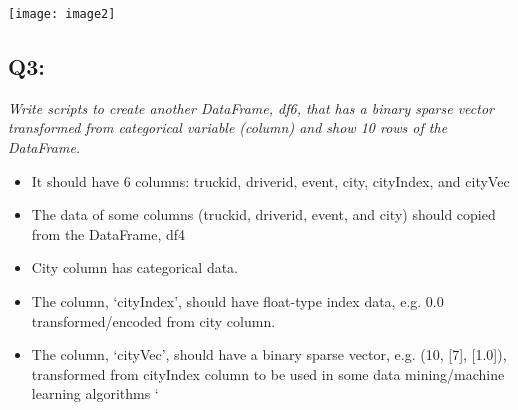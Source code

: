 \documentclass[]{article}
\begin{document}
\texttt{[image: image2]}

\subsection*{Q3: }
\emph{Write scripts to create another DataFrame, df6, 
	that has a binary sparse vector transformed from 
	categorical variable (column) and show 10 rows of the DataFrame.} \\
	\begin{itemize}[before=\itshape,font=\normalfont]
		\item It should have 6 columns: truckid, driverid, event, city, cityIndex, and cityVec
		\item The data of some columns (truckid, driverid, event, and city) should copied from the DataFrame, df4
		\item City column has categorical data.
		\item The column, ‘cityIndex’, should have float-type index data, e.g. 0.0 transformed/encoded from city column.
		\item The column, ‘cityVec’, should have a binary sparse vector, e.g. (10, [7], [1.0]), transformed from cityIndex column to be used in some data mining/machine learning algorithms
`	\end{itemize} 


\begin{verbatim}
\end{verbatim}
\end{document}
